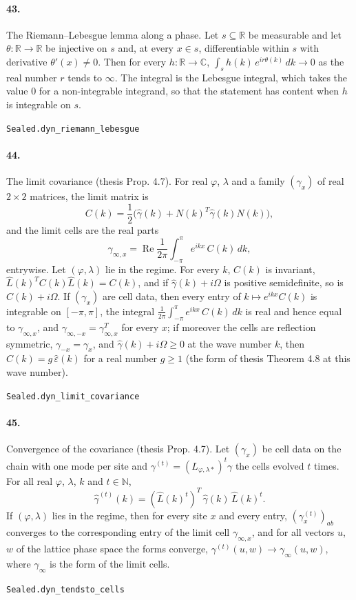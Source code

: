 \documentclass[11pt]{article}
\begin{document}
\paragraph{43.} The Riemann–Lebesgue lemma along a phase. Let $s \subseteq \mathbb R$ be measurable and let $\theta : \mathbb R \to \mathbb R$ be injective on $s$ and, at every $x \in s$, differentiable within $s$ with derivative $\theta'(x) \neq 0$. Then for every $h : \mathbb R \to \mathbb C$, $\int_s h(k)\, e^{ir\theta(k)}\, dk \to 0$ as the real number $r$ tends to $\infty$. The integral is the Lebesgue integral, which takes the value $0$ for a non-integrable integrand, so that the statement has content when $h$ is integrable on $s$.\par{\footnotesize\texttt{Sealed.dyn\_riemann\_lebesgue}}

\paragraph{44.} The limit covariance (thesis Prop. 4.7). For real $\varphi$, $\lambda$ and a family $(\gamma_x)$ of real $2 \times 2$ matrices, the limit matrix is \[C(k) = \frac12\bigl(\hat\gamma(k) + N(k)^T \hat\gamma(k) N(k)\bigr),\] and the limit cells are the real parts \[\gamma_{\infty, x} = \operatorname{Re} \frac1{2\pi}\int_{-\pi}^{\pi} e^{ikx}\, C(k)\, dk,\] entrywise. Let $(\varphi, \lambda)$ lie in the regime. For every $k$, $C(k)$ is invariant, $\hat L(k)^T C(k) \hat L(k) = C(k)$, and if $\hat\gamma(k) + i\Omega$ is positive semidefinite, so is $C(k) + i\Omega$. If $(\gamma_x)$ are cell data, then every entry of $k \mapsto e^{ikx} C(k)$ is integrable on $[-\pi, \pi]$, the integral $\frac1{2\pi}\int_{-\pi}^{\pi} e^{ikx}\, C(k)\, dk$ is real and hence equal to $\gamma_{\infty, x}$, and $\gamma_{\infty, -x} = \gamma_{\infty, x}^T$ for every $x$; if moreover the cells are reflection symmetric, $\gamma_{-x} = \gamma_x$, and $\hat\gamma(k) + i\Omega \ge 0$ at the wave number $k$, then $C(k) = g\, \hat\varepsilon(k)$ for a real number $g \ge 1$ (the form of thesis Theorem 4.8 at this wave number).\par{\footnotesize\texttt{Sealed.dyn\_limit\_covariance}}

\paragraph{45.} Convergence of the covariance (thesis Prop. 4.7). Let $(\gamma_x)$ be cell data on the chain with one mode per site and $\gamma^{(t)} = (L_{\varphi, \lambda*})^t \gamma$ the cells evolved $t$ times. For all real $\varphi$, $\lambda$, $k$ and $t \in \mathbb N$, \[\hat\gamma^{(t)}(k) = (\hat L(k)^t)^T\, \hat\gamma(k)\, \hat L(k)^t.\] If $(\varphi, \lambda)$ lies in the regime, then for every site $x$ and every entry, $(\gamma^{(t)}_x)_{ab}$ converges to the corresponding entry of the limit cell $\gamma_{\infty, x}$, and for all vectors $u$, $w$ of the lattice phase space the forms converge, $\gamma^{(t)}(u, w) \to \gamma_\infty(u, w)$, where $\gamma_\infty$ is the form of the limit cells.\par{\footnotesize\texttt{Sealed.dyn\_tendsto\_cells}}
\end{document}
